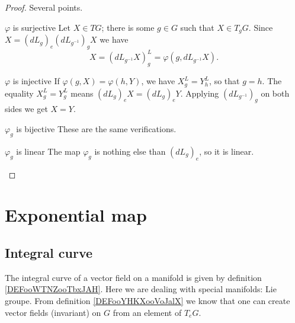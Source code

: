 \begin{proof}
    Several points.
    \begin{subproof}
        \item[\( \varphi\) is surjective]
            Let \( X\in TG\); there is some \( g\in G\) such that \( X\in T_gG\). Since \( X=(dL_g)_e(dL_{g^{-1}})_gX\) we have
            \begin{equation}
                X=(dL_{g^{-1}}X)^L_g=\varphi(g,dL_{g^{-1}}X).
            \end{equation}
        \item[\( \varphi\) is injective]
            If \( \varphi(g,X)=\varphi(h,Y)\), we have \( X_g^L=Y^L_h\), so that \( g=h\). The equality  \( X_g^L=Y_g^L\) means \( (dL_g)_eX=(dL_g)_eY\). Applying \( (dL_{g^{-1}})_g\) on both sides we get \( X=Y\).
        \item[\( \varphi_g\) is bijective]
            These are the same verifications.
        \item[\( \varphi_g\) is linear]
            The map \( \varphi_g\) is nothing else than \( (dL_g)_e\), so it is linear.
    \end{subproof}
\end{proof}

\section{Exponential map}

\subsection{Integral curve}

The integral curve of a vector field on a manifold is given by definition \ref{DEFooWTNZooTbxJAH}. Here we are dealing with special manifolds: Lie groupe. From definition \ref{DEFooYHKXooVoJalX} we know that one can create vector fields (invariant) on \( G\) from an element of \( T_eG\).

